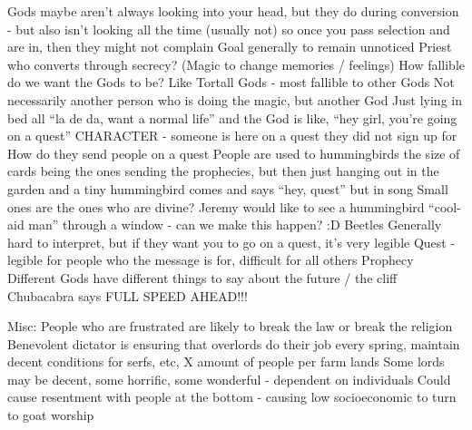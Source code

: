 \documentclass[blue]{GL2020}
\begin{document}
Gods maybe aren’t always looking into your head, but they do during conversion - but also isn’t looking all the time (usually not) so once you pass selection and are in, then they might not complain
Goal generally to remain unnoticed
Priest who converts through secrecy?  (Magic to change memories / feelings)
How fallible do we want the Gods to be?
Like Tortall Gods - most fallible to other Gods
Not necessarily another person who is doing the magic, but another God
Just lying in bed all “la de da, want a normal life” and the God is like, “hey girl, you’re going on a quest”
CHARACTER - someone is here on a quest they did not sign up for
How do they send people on a quest
People are used to hummingbirds the size of cards being the ones sending the prophecies, but then just hanging out in the garden and a tiny hummingbird comes and says “hey, quest” but in song
Small ones are the ones who are divine?
Jeremy would like to see a hummingbird “cool-aid man” through a window - can we make this happen? :D
Beetles
Generally hard to interpret, but if they want you to go on a quest, it’s very legible
Quest - legible for people who the message is for, difficult for all others
Prophecy
Different Gods have different things to say about the future / the cliff
Chubacabra says FULL SPEED AHEAD!!!

Misc:
People who are frustrated are likely to break the law or break the religion
Benevolent dictator is ensuring that overlords do their job every spring, maintain decent conditions for serfs, etc, X amount of people per farm lands
Some lords may be decent, some horrific, some wonderful - dependent on individuals
Could cause resentment with people at the bottom - causing low socioeconomic to turn to goat worship\\
 
\end{document}
